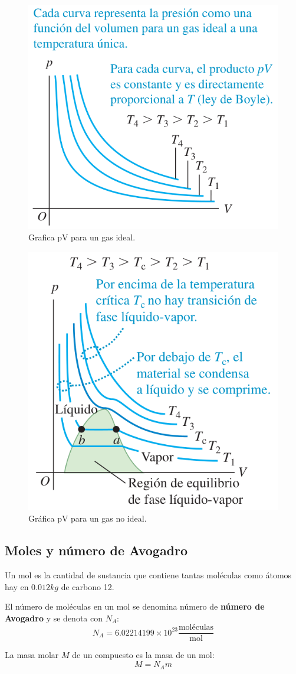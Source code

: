 \documentclass[12pt]{article}
\begin{document}
  \begin{figure}[H]
    \centering
    \includegraphics[width=0.5\linewidth]{imagenes/g-pv-gas-ideal.png}
    \caption{Grafica pV para un gas ideal.}
    \label{fig:pv-gas-ideal}
  \end{figure}
  
  \begin{figure}[H]
    \centering
    \includegraphics[width=0.5\linewidth]{imagenes/g-pv-gas-no-ideal.png}
    \caption{Gráfica pV para un gas no ideal.}
    \label{fig:pv-gas-no-ideal}
  \end{figure}

  \subsection{Moles y número de Avogadro}
  Un mol es la cantidad de sustancia que contiene tantas moléculas como átomos hay en $ 0.012kg $ de carbono 12.

  El número de moléculas en un mol se denomina número de \textbf{número de Avogadro} y se denota con $ N_{A} $:
  \[
  N_{A} = 6.02214199\times 10^{23}\frac{\text{moléculas}}{\text{mol}}
  \]

  La masa molar $ M $ de un compuesto es la masa de un mol:
  \[
  M = N_{A}m
  \]
  
\end{document}
